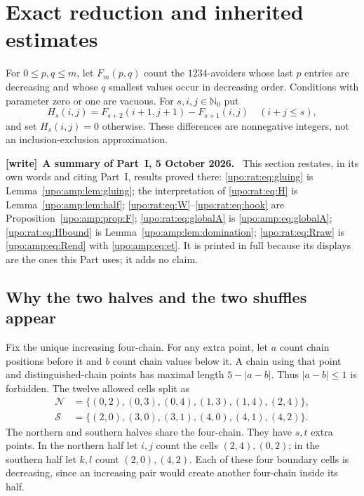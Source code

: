 \documentclass[11pt,letterpaper]{article}
\theoremstyle{remark}\newtheorem{remark}[theorem]{Remark}
\numberwithin{equation}{section}
\newcommand{\N}{\mathbb N_0}
\newenvironment{writenote}[1][]{\par\smallskip\begingroup\small
 \noindent\textbf{[write]}\if\relax\detokenize{#1}\relax\else~\textbf{#1.}\fi\ }%
 {\par\endgroup\smallskip}
\begin{document}
\section{Exact reduction and inherited estimates}\label{upo:rat:sec:inputs}
For $0\le p,q\le m$, let $F_m(p,q)$ count the $1234$-avoiders whose
last $p$ entries are decreasing and whose $q$ smallest values occur in
decreasing order. Conditions with parameter zero or one are vacuous.
For $s,i,j\in\N$ put
\begin{equation}\label{upo:rat:eq:H}
H_s(i,j)=F_{s+2}(i+1,j+1)-F_{s+1}(i,j)\quad(i+j\le s),
\end{equation}
and set $H_s(i,j)=0$ otherwise. These differences are nonnegative integers,
not an inclusion-exclusion approximation.
\begin{writenote}[A summary of Part~I, 5 October 2026]
This section restates, in its own words and citing Part~I, results proved there: \eqref{upo:rat:eq:gluing} is Lemma~\ref{upo:amp:lem:gluing}; the interpretation of \eqref{upo:rat:eq:H} is Lemma~\ref{upo:amp:lem:half}; \eqref{upo:rat:eq:W}--\eqref{upo:rat:eq:hook} are Proposition~\ref{upo:amp:prop:F}; \eqref{upo:rat:eq:globalA} is \eqref{upo:amp:eq:globalA}; \eqref{upo:rat:eq:Hbound} is Lemma~\ref{upo:amp:lem:domination}; \eqref{upo:rat:eq:Rraw} is \eqref{upo:amp:eq:Rend} with \eqref{upo:amp:eq:et}. It is printed in full because its displays are the ones this Part uses; it adds no claim.
\end{writenote}

\subsection{Why the two halves and the two shuffles appear}
Fix the unique increasing four-chain. For any extra point, let $a$ count
chain positions before it and $b$ count chain values below it. A chain
using that point and distinguished-chain points has maximal length
$5-|a-b|$. Thus $|a-b|\le1$ is forbidden. The twelve allowed cells split as
\begin{align*}
\mathcal N&=\{(0,2),(0,3),(0,4),(1,3),(1,4),(2,4)\},\\
\mathcal S&=\{(2,0),(3,0),(3,1),(4,0),(4,1),(4,2)\}.
\end{align*}
The northern and southern halves share the four-chain. They have $s,t$
extra points. In the northern half let $i,j$ count the cells $(2,4),(0,2)$;
in the southern half let $k,l$ count $(2,0),(4,2)$.
Each of these four boundary cells is decreasing, since an increasing
pair would create another four-chain inside its half.
\end{document}
